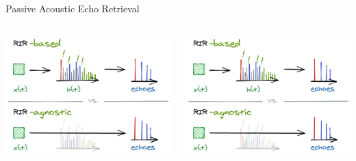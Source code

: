 \begin{frame}[t]{\alert{Passive} Acoustic Echo Retrieval \hfill\faBook}
        \vspace{.5em}
        \begin{columns}[onlytextwidth] %
            \begin{column}{.48\textwidth}
                \includegraphics[trim={0 31em 0 7em},clip,width=.9\textwidth]{./figures/based-agnostic.png}
            \end{column}
            \begin{column}{.48\textwidth}
                \includegraphics[trim={0 0 0 40em},clip,width=.9\textwidth]{./figures/based-agnostic.png}
            \end{column}%
        \end{columns}


\end{frame}
